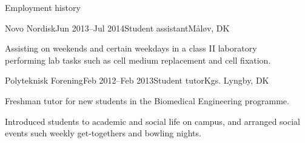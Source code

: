 \documentclass{resume} %
\begin{document}
\begin{rSection}{Employment history}
	
	\begin{rSubsection}{Novo Nordisk}{Jun 2013--Jul 2014}{Student assistant}{Måløv, DK}
		\item Assisting on weekends and certain weekdays in a class II laboratory \\performing lab tasks such as cell medium replacement and cell fixation.
	\end{rSubsection}
	
	
	\begin{rSubsection}{Polyteknisk Forening}{Feb 2012--Feb 2013}{Student tutor}{Kgs. Lyngby, DK}
		\item Freshman tutor for new students in the Biomedical Engineering programme. 
		\item Introduced students to academic and social life on campus, and arranged social \\events such weekly get-togethers and bowling nights.
	\end{rSubsection}
	
\end{rSection}
\end{document}
